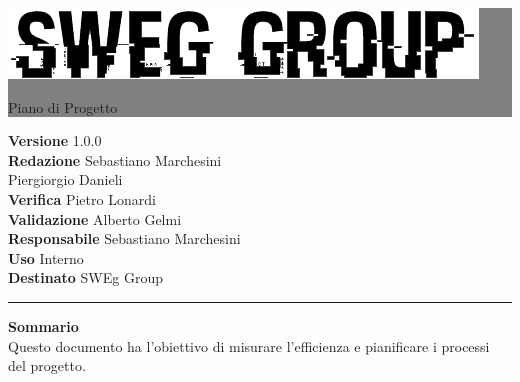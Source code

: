 \documentclass[12pt,a4paper,titlepage]{article}
\newcommand{\HRule}[1]{\hfill \rule{0.2\linewidth}{#1}} %
\begin{document}
	
	\thispagestyle{empty} %
	
	
	\colorbox{grey}{
		\parbox[t]{1.0\linewidth}{
			\centering \fontsize{50pt}{80pt}\selectfont %
			\vspace*{0.7cm} %
			
			\raggedleft
			\includegraphics[width=0.7\linewidth]{../../LogoSWEgGroupSFONDOVUOTO}
			
			\hfill Piano di Progetto \\
			
			\vspace*{0.7cm} %
		}
	}
	
	
	\vfill %
	
	
	{\centering \large 
		\hfill \textbf{Versione} 1.0.0 \\
		\hfill \textbf{Redazione} Sebastiano Marchesini \\
		\hfill Piergiorgio Danieli \\
		\hfill \textbf{Verifica} Pietro Lonardi \\
		\hfill \textbf{Validazione} Alberto Gelmi \\
		\hfill \textbf{Responsabile} Sebastiano Marchesini \\
		\hfill \textbf{Uso} Interno \\
		\hfill \textbf{Destinato} SWEg Group \\ 
		
		\HRule{1pt}
		
		\textbf{Sommario} \\
	    Questo documento ha l'obiettivo di misurare l'efficienza e pianificare i processi del progetto.
		
	} %
	
\end{document}

